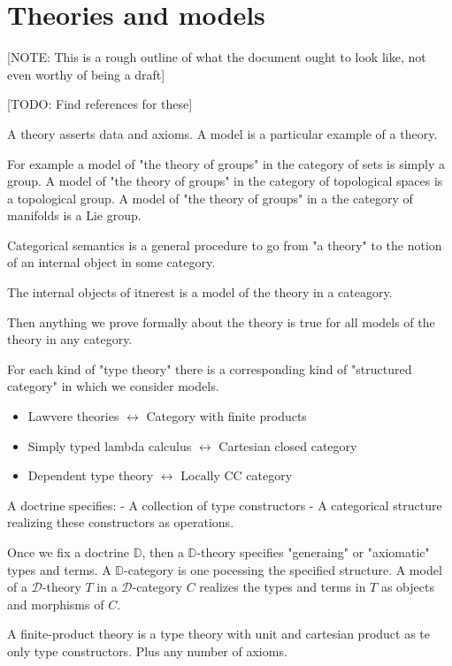 \section{Theories and models}

[NOTE: This is a rough outline of what the document ought to look like, not even worthy of being a draft]

[TODO: Find references for these]
\begin{defin}
    A theory asserts data and axioms.
    A model is a particular example of a theory.
\end{defin}

For example a model of "the theory of groups" in the category of sets is simply a group. A model of "the theory of groups" in the category of topological spaces is a topological group. A model of "the theory of groups" in a the category of manifolds is a Lie group.

Categorical semantics is a general procedure to go from "a theory" to the notion of an internal object in some category.

The internal objects of itnerest is a model of the theory in a cateagory.

Then anything we prove formally about the theory is true for all models of the theory in any category.

For each kind of "type theory" there is a corresponding kind of "structured category" in which we consider models.

\begin{itemize}
\item Lawvere theories $\leftrightarrow$ Category with finite products
\item Simply typed lambda calculus $\leftrightarrow$ Cartesian closed category
\item Dependent type theory $\leftrightarrow$ Locally CC category
\end{itemize}

A doctrine specifies:
 - A collection of type constructors
 - A categorical structure realizing these constructors as operations.

Once we fix a doctrine $\mathbb{D}$, then a $\mathbb{D}$-theory specifies "generaing" or "axiomatic" types and terms.
A $\mathbb{D}$-category is one pocessing the specified structure.
A model of a $\mathcal{D}$-theory $T$ in a $\mathcal{D}$-category $C$ realizes the types and terms in $T$ as objects and morphisms of $C$.

A finite-product theory is a type theory with unit and cartesian product as te only type constructors. Plus any number of axioms.

